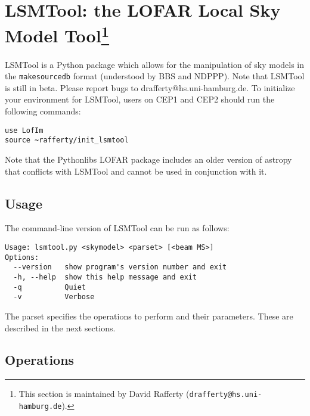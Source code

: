 \documentclass[structabstract]{article}
\begin{document}

\section[LSMTool: the LOFAR Local Sky Model Tool]{LSMTool: the LOFAR Local Sky Model Tool\footnote{This section is maintained by David Rafferty ({\tt drafferty@hs.uni-hamburg.de}).}}
\label{lsmtool}

LSMTool is a Python package which allows for the manipulation of sky models in the \texttt{makesourcedb} format (understood by BBS and NDPPP). Note that LSMTool is still in beta. Please report bugs to drafferty@hs.uni-hamburg.de. To initialize your environment for LSMTool, users on CEP1 and CEP2 should run the following commands:
\begin{verbatim}
use LofIm
source ~rafferty/init_lsmtool
\end{verbatim}
Note that the Pythonlibs LOFAR package includes an older version of astropy that conflicts with LSMTool and cannot be used in conjunction with it.

\subsection{Usage}
\label{lsmtool:usage}

The command-line version of LSMTool can be run as follows:
\begin{verbatim}
Usage: lsmtool.py <skymodel> <parset> [<beam MS>]
Options:
  --version   show program's version number and exit
  -h, --help  show this help message and exit
  -q          Quiet
  -v          Verbose
\end{verbatim}
The parset specifies the operations to perform and their parameters. These are described in the next sections.

\subsection{Operations}
\label{lsmtool:operations}
\end{document}
